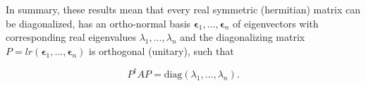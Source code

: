 \documentclass[a4paper,12pt]{report}
\begin{document}
In summary, these results mean that every real symmetric (hermitian) matrix can be diagonalized, has an ortho-normal basis \(\boldsymbol{\epsilon }_{1}, \ldots , \boldsymbol{\epsilon }_{n}    \) of eigenvectors with corresponding real eigenvalues \(\lambda _{1}, \ldots , \lambda _{n}  \) and the diagonalizing matrix \(P = lr(\boldsymbol{\epsilon }_{1}, \ldots , \boldsymbol{\epsilon } _{n}   )\) is orthogonal (unitary), such that 

\begin{equation}
    P^{\dagger} AP = \text{diag}(\lambda _{1}, \ldots ,\lambda _{n}). 
\end{equation}








































































  
\end{document}
